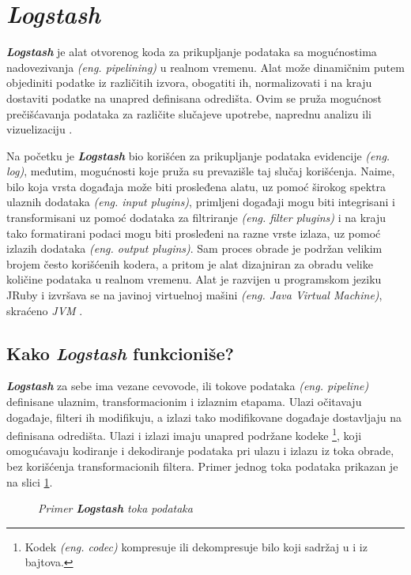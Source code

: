 \section{\textit{\textbf{Logstash}}}
\textit{\textbf{Logstash}} je alat otvorenog koda za prikupljanje podataka sa mogućnostima nadovezivanja \textit{(eng. pipelining)} u realnom vremenu. Alat može dinamičnim putem objediniti podatke iz različitih izvora, obogatiti ih, normalizovati i na kraju dostaviti podatke na unapred definisana odredišta. Ovim se pruža mogućnost prečišćavanja podataka za različite slučajeve upotrebe, naprednu analizu ili vizuelizaciju \cite{elastic-logstash}.

\par
Na početku je \textit{\textbf{Logstash}} bio korišćen za prikupljanje podataka evidencije \textit{(eng. log)}, međutim, mogućnosti koje pruža su prevazišle taj slučaj korišćenja. Naime, bilo koja vrsta događaja može biti prosleđena alatu, uz pomoć širokog spektra ulaznih dodataka \textit{(eng. input plugins)}, primljeni događaji mogu biti integrisani i transformisani uz pomoć dodataka za filtriranje \textit{(eng. filter plugins)} i na kraju tako formatirani podaci mogu biti prosleđeni na razne vrste izlaza, uz pomoć izlazih dodataka \textit{(eng. output plugins)}. Sam proces obrade je podržan velikim brojem često korišćenih kodera, a pritom je alat dizajniran za obradu velike količine podataka u realnom vremenu. Alat je razvijen u programskom jeziku JRuby i izvršava se na javinoj virtuelnoj mašini \textit{(eng. Java Virtual Machine)}, skraćeno \textit{JVM} \cite{jvm}.

\subsection{Kako \textit{\textbf{Logstash}} funkcioniše?}
\textit{\textbf{Logstash}} za sebe ima vezane cevovode, ili tokove podataka \textit{(eng. pipeline)} definisane ulaznim, transformacionim i izlaznim etapama. Ulazi očitavaju događaje, filteri ih modifikuju, a izlazi tako modifikovane događaje dostavljaju na definisana odredišta. Ulazi i izlazi imaju unapred podržane kodeke \footnote{Kodek \textit{(eng. codec)} kompresuje ili dekompresuje bilo koji sadržaj u i iz bajtova.\cite{codec}}, koji omogućavaju kodiranje i dekodiranje podataka pri ulazu i izlazu iz toka obrade, bez korišćenja transformacionih filtera. Primer jednog toka podataka prikazan je na slici \ref{diagram:primer-logstash-toka-podataka}.

\begin{figure}[H]
    \centering
    \columnwidth%
    \fboxrule=1pt%
    \caption{\textit{Primer \textbf{Logstash} toka podataka}}
    \label{diagram:primer-logstash-toka-podataka}
\end{figure}


